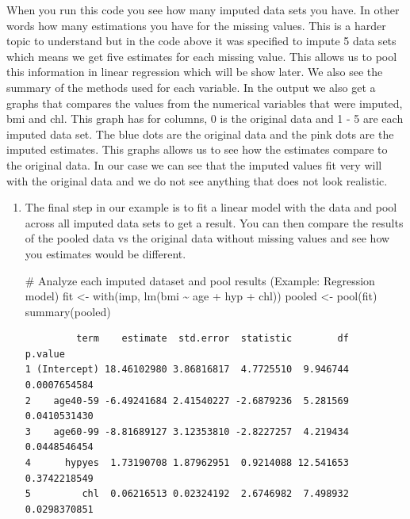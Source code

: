 \documentclass[
  letterpaper,
  DIV=11,
  numbers=noendperiod]{scrreprt}
\newenvironment{Shaded}{\begin{snugshade}}{\end{snugshade}}
\newcommand{\CommentTok}[1]{\textcolor[rgb]{0.37,0.37,0.37}{#1}}
\newcommand{\FunctionTok}[1]{\textcolor[rgb]{0.28,0.35,0.67}{#1}}
\newcommand{\NormalTok}[1]{\textcolor[rgb]{0.00,0.23,0.31}{#1}}
\newcommand{\OtherTok}[1]{\textcolor[rgb]{0.00,0.23,0.31}{#1}}
\newcommand{\SpecialCharTok}[1]{\textcolor[rgb]{0.37,0.37,0.37}{#1}}
\begin{document}
When you run this code you see how many imputed data sets you have. In
other words how many estimations you have for the missing values. This
is a harder topic to understand but in the code above it was specified
to impute 5 data sets which means we get five estimates for each missing
value. This allows us to pool this information in linear regression
which will be show later. We also see the summary of the methods used
for each variable. In the output we also get a graphs that compares the
values from the numerical variables that were imputed, bmi and chl. This
graph has for columns, 0 is the original data and 1 - 5 are each imputed
data set. The blue dots are the original data and the pink dots are the
imputed estimates. This graphs allows us to see how the estimates
compare to the original data. In our case we can see that the imputed
values fit very will with the original data and we do not see anything
that does not look realistic.

\begin{enumerate}
\def\labelenumi{\arabic{enumi}.}
\setcounter{enumi}{6}
\item
  The final step in our example is to fit a linear model with the data
  and pool across all imputed data sets to get a result. You can then
  compare the results of the pooled data vs the original data without
  missing values and see how you estimates would be different.

\begin{Shaded}
\begin{Highlighting}[]
\CommentTok{\# Analyze each imputed dataset and pool results (Example: Regression model)}
\NormalTok{fit }\OtherTok{\textless{}{-}} \FunctionTok{with}\NormalTok{(imp, }\FunctionTok{lm}\NormalTok{(bmi }\SpecialCharTok{\textasciitilde{}}\NormalTok{ age }\SpecialCharTok{+}\NormalTok{ hyp }\SpecialCharTok{+}\NormalTok{ chl))}
\NormalTok{pooled }\OtherTok{\textless{}{-}} \FunctionTok{pool}\NormalTok{(fit)}
\FunctionTok{summary}\NormalTok{(pooled)}
\end{Highlighting}
\end{Shaded}

\begin{verbatim}
         term    estimate  std.error  statistic        df      p.value
1 (Intercept) 18.46102980 3.86816817  4.7725510  9.946744 0.0007654584
2    age40-59 -6.49241684 2.41540227 -2.6879236  5.281569 0.0410531430
3    age60-99 -8.81689127 3.12353810 -2.8227257  4.219434 0.0448546454
4      hypyes  1.73190708 1.87962951  0.9214088 12.541653 0.3742218549
5         chl  0.06216513 0.02324192  2.6746982  7.498932 0.0298370851
\end{verbatim}
\end{enumerate}
\end{document}
